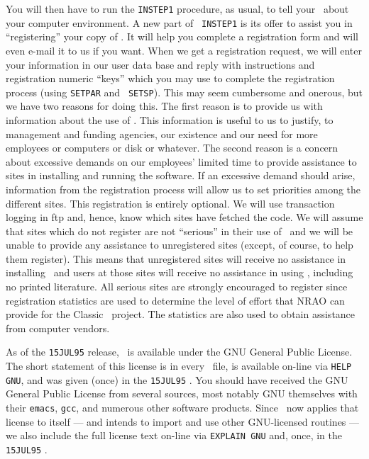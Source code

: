 You will then have to run the {\tt INSTEP1} procedure, as usual, to
tell your \AIPS\ about your computer environment.  A new part of {\tt
INSTEP1} is its offer to assist you in ``registering'' your copy of
\hbox{\AIPS}.  It will help you complete a registration form and will
even e-mail it to us if you want.  When we get a registration request,
we will enter your information in our user data base and reply with
instructions and registration numeric ``keys'' which you may use to
complete the registration process (using {\tt SETPAR} and \hbox{{\tt
SETSP}}).  This may seem cumbersome and onerous, but we have two
reasons for doing this.  The first reason is to provide us with
information about the use of \hbox{\AIPS}.  This information is useful
to us to justify, to management and funding agencies, our existence
and our need for more employees or computers or disk or whatever.  The
second reason is a concern about excessive demands on our employees'
limited time to provide assistance to sites in installing and running
the software.  If an excessive demand should arise, information from
the registration process will allow us to set priorities among the
different sites.  This registration is entirely optional.  We will use
transaction logging in ftp and, hence, know which sites have fetched
the code.  We will assume that sites which do not register are not
``serious'' in their use of \AIPS\ and we will be unable to provide
any assistance to unregistered sites (except, of course, to help them
register).  This means that unregistered sites will receive no
assistance in installing \AIPS\ and users at those sites will receive
no assistance in using \AIPS, including no printed literature.  All
serious sites are strongly encouraged to register since registration
statistics are used to determine the level of effort that NRAO can
provide for the Classic \AIPS\ project.  The statistics are also used
to obtain assistance from computer vendors.

As of the {\tt 15JUL95} release, \AIPS\ is available under the GNU
General Public License.  The short statement of this license is in
every \AIPS\ file, is available on-line via {\tt HELP GNU}, and was
given (once) in the {\tt 15JUL95} \hbox{\Aipsletter}.  You should have
received the GNU General Public License from several sources, most
notably GNU themselves with their {\tt emacs}, {\tt gcc}, and numerous
other software products.  Since \AIPS\ now applies that license to
itself --- and intends to import and use other GNU-licensed routines
--- we also include the full license text on-line via {\tt EXPLAIN
GNU} and, once, in the {\tt 15JUL95} \hbox{\Aipsletter}.

